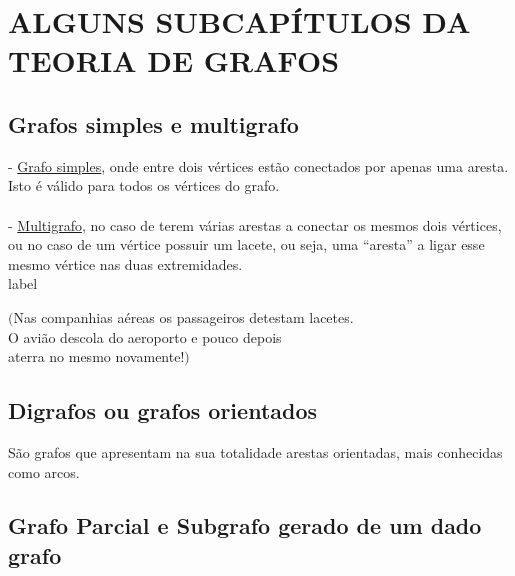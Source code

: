\section{ALGUNS SUBCAPÍTULOS DA TEORIA DE GRAFOS}
\subsection{Grafos simples e multigrafo}
- \underline{Grafo simples}, onde entre dois vértices estão conectados por apenas uma aresta. Isto é válido para 
todos os vértices do grafo.\\
\figure
\\
- \underline{Multigrafo}, no caso de terem várias arestas a conectar os mesmos dois vértices, ou no caso de um 
vértice possuir um lacete, ou seja, uma “aresta” a ligar esse mesmo vértice nas duas extremidades.\\
label 
\\
\begin{flushright}
    $($Nas companhias aéreas os passageiros detestam lacetes.\\O avião descola do aeroporto e pouco depois\\aterra no mesmo novamente!$)$
\end{flushright}

\subsection{Digrafos ou grafos orientados}
São grafos que apresentam na sua totalidade arestas orientadas, mais conhecidas como arcos.
\\
\subsection{Grafo Parcial e Subgrafo gerado de um dado grafo}
